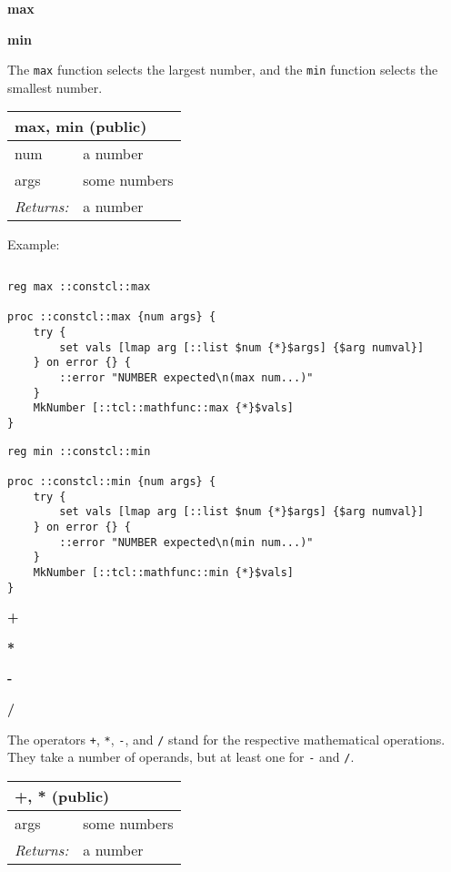 \documentclass{report}
\begin{document}
\textbf{max}


\textbf{min}


The \texttt{max} function selects the largest number, and the \texttt{min} function selects the smallest number.

\begin{tabular}{ |l l| }
\hline
\multicolumn{2}{|l|}{max, min (public)} \\
\hline
num & a number \\
args & some numbers \\
\textit{Returns:} & a number \\
\hline
\end{tabular}


Example:

\noindent\makebox[\linewidth]{\rule{\linewidth}{0.4pt}}
\begin{lstlisting}
\end{lstlisting}
\noindent\makebox[\linewidth]{\rule{\linewidth}{0.4pt}}
\noindent\makebox[\linewidth]{\rule{\linewidth}{0.4pt}}
\begin{lstlisting}
reg max ::constcl::max
 
proc ::constcl::max {num args} {
    try {
        set vals [lmap arg [::list $num {*}$args] {$arg numval}]
    } on error {} {
        ::error "NUMBER expected\n(max num...)"
    }
    MkNumber [::tcl::mathfunc::max {*}$vals]
}
\end{lstlisting}
\noindent\makebox[\linewidth]{\rule{\linewidth}{0.4pt}}
\noindent\makebox[\linewidth]{\rule{\linewidth}{0.4pt}}
\begin{lstlisting}
reg min ::constcl::min
 
proc ::constcl::min {num args} {
    try {
        set vals [lmap arg [::list $num {*}$args] {$arg numval}]
    } on error {} {
        ::error "NUMBER expected\n(min num...)"
    }
    MkNumber [::tcl::mathfunc::min {*}$vals]
}
\end{lstlisting}
\noindent\makebox[\linewidth]{\rule{\linewidth}{0.4pt}}

\textbf{+}


\textbf{*}


\textbf{-}


\textbf{/}


The operators \texttt{+}, \texttt{*}, \texttt{-}, and \texttt{/} stand for the respective mathematical operations. They take a number of operands, but at least one for \texttt{-} and \texttt{/}.

\begin{tabular}{ |l l| }
\hline
\multicolumn{2}{|l|}{+, * (public)} \\
\hline
args & some numbers \\
\textit{Returns:} & a number \\
\hline
\end{tabular}
\end{document}
